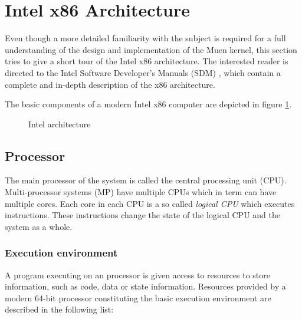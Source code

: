 \section{Intel x86 Architecture}
Even though a more detailed familiarity with the subject is required for a full
understanding of the design and implementation of the Muen kernel, this section
tries to give a short tour of the Intel x86 architecture. The interested reader
is directed to the Intel Software Developer's Manuals (SDM)
\cite{IntelSDM}, which contain a complete and in-depth description of the x86
architecture.

The basic components of a modern Intel x86 computer are depicted in figure
\ref{fig:intel-architecture}.

\begin{figure}[h]
	\centering
	
	\caption{Intel architecture}
	\label{fig:intel-architecture}
\end{figure}

\subsection{Processor}
The main processor of the system is called the central processing unit
(CPU). Multi-processor systems (MP) have multiple CPUs
which in term can have multiple cores. Each core in each CPU is a so called
\emph{logical CPU} which executes instructions. These instructions change the
state of the logical CPU and the system as a whole.

\subsubsection{Execution environment}\label{subsubsec:exec-env}
A program executing on an processor is given access to resources to store
information, such as code, data or state information. Resources provided by a
modern 64-bit processor constituting the basic execution environment are
described in the following list:

